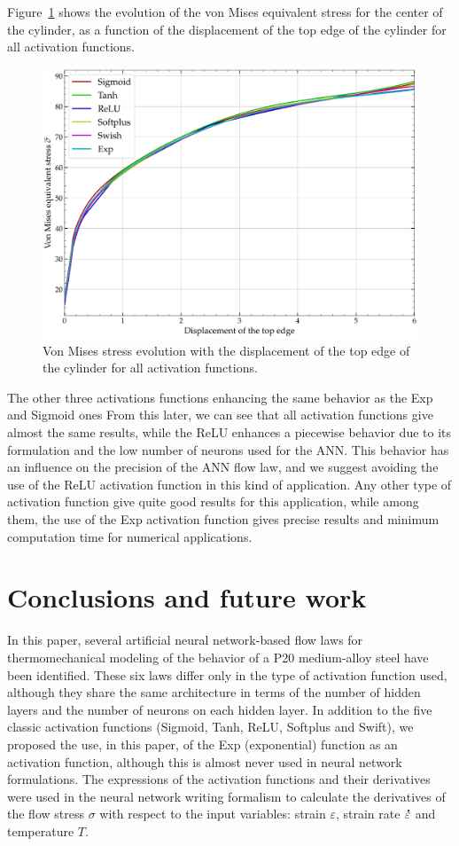 \documentclass[algorithms,article,submit,pdftex,oneauthors]{Definitions/mdpi}
\DeclareRobustCommand{\mdot}[1]{\accentset{\mbox{\bfseries .}}{#1}}
\begin{document}
Figure~\ref{fig:Num-misesTH} shows the evolution of the von Mises equivalent stress for the center of the cylinder, as a function of the displacement of the top edge of the cylinder for all activation functions.
\begin{figure}[h!]
\centering
\includegraphics[width=0.7\columnwidth]{Figures/vonMises}
\caption{Von Mises stress evolution with the displacement of the top edge of the cylinder for all activation functions.}
\label{fig:Num-misesTH}
\end{figure}
The other three activations functions enhancing the same behavior as the Exp and Sigmoid ones %
From this later, we can see that all activation functions give almost the same results, while the ReLU enhances a piecewise behavior due to its formulation and the low number of neurons used for the ANN.
This behavior has an influence on the precision of the ANN flow law, and we suggest avoiding the use of the ReLU activation function in this kind of application.
Any other type of activation function give quite good results for this application, while among them, the use of the Exp activation function gives precise results and minimum computation time for numerical applications.

\section{Conclusions and future work}\label{sec:Conclusions}

In this paper, several artificial neural network-based flow laws for thermomechanical modeling of the behavior of a P20 medium-alloy steel have been identified.
These six laws differ only in the type of activation function used, although they share the same architecture in terms of the number of hidden layers and the number of neurons on each hidden layer.
In addition to the five classic activation functions (Sigmoid, Tanh, ReLU, Softplus and Swift), we proposed the use, in this paper, of the Exp (exponential) function as an activation function, although this is almost never used in neural network formulations.
The expressions of the activation functions and their derivatives were used in the neural network writing formalism to calculate the derivatives of the flow stress $\sigma$ with respect to the input variables: strain $\varepsilon$, strain rate $\mdot{\varepsilon}$ and temperature $T$.
\end{document}
